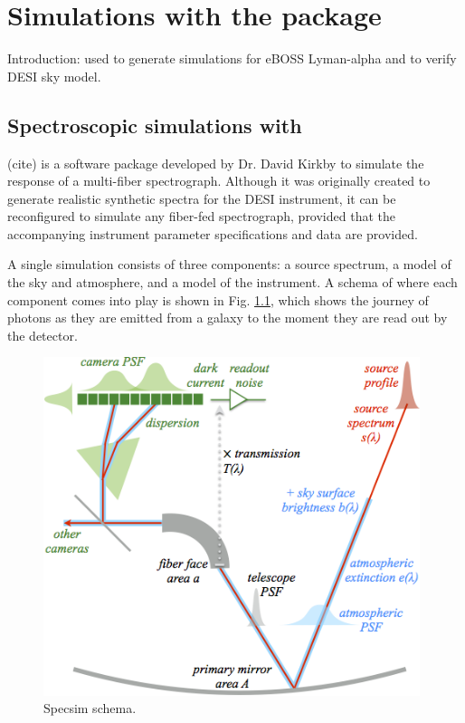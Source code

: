 \chapter{Simulations with the  package}

Introduction: used to generate simulations for eBOSS Lyman-alpha and to verify DESI sky model. 

\section{Spectroscopic simulations with }

 (cite) is a software package developed by Dr. David Kirkby to simulate the response of a multi-fiber spectrograph. Although it was originally created to generate realistic synthetic spectra for the DESI instrument, it can be reconfigured to simulate any fiber-fed spectrograph, provided that the accompanying instrument parameter specifications and data are provided.

A single simulation consists of three components: a source spectrum, a model of the sky and atmosphere, and a model of the instrument. A schema of where each component comes into play is shown in Fig. \ref{fig:schema}, which shows the journey of photons as they are emitted from a galaxy to the moment they are read out by the detector.

\begin{figure}[h]
\centering
\includegraphics[width=11cm]{images/specsim/overview.png}
\caption{Specsim schema.}
\label{fig:schema}
\end{figure}

